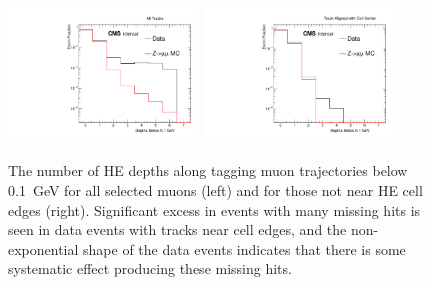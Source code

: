 \begin{figure}[htbp]
	\centering
	\includegraphics[width=0.45\textwidth]{figures/hcalAllMissingHits.pdf}
        \hspace{0.01\textwidth}
        \includegraphics[width=0.45\textwidth]{figures/hcalMissingHits.pdf}
        \caption[Missing muon hits in HE]{The number of HE depths along tagging muon trajectories below \SI{0.1}{\giga\eV} for all selected muons (left) and for those not near HE cell edges (right). Significant excess in events with many missing hits is seen in data events with tracks near cell edges, and the non-exponential shape of the data events indicates that there is some systematic effect producing these missing hits.}
        \label{fig:missingHits}
\end{figure}

